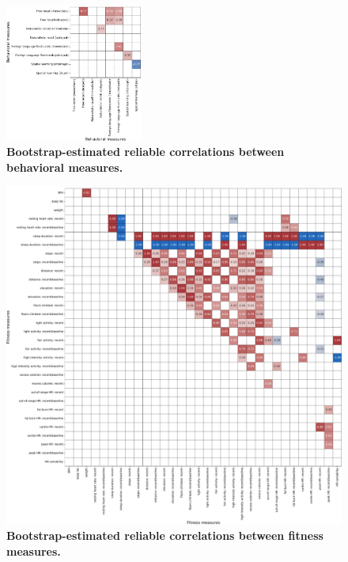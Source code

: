 \documentclass[10pt]{article}
\begin{document}
\begin{figure}[p]
\centering
\includegraphics[width=0.4\textwidth]{figs/behavior_behavior_correlations}
\caption{\textbf{Bootstrap-estimated reliable correlations between
    behavioral measures.}}
\label{fig:behavioral_corrs}
\end{figure}

\begin{figure}[p]
\centering
\includegraphics[width=\textwidth]{figs/fitness_fitness_correlations}
\caption{\textbf{Bootstrap-estimated reliable correlations between
    fitness measures.}}
\label{fig:fitness_corrs}
\end{figure}
\end{document}

